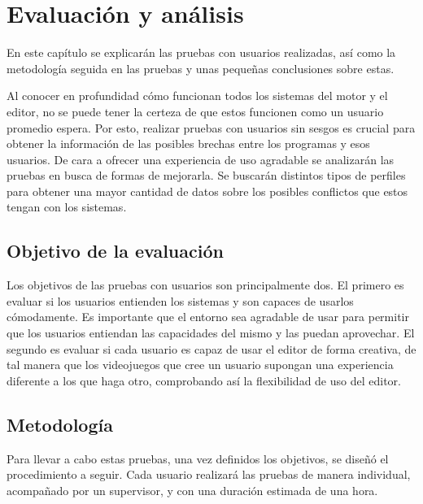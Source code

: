 \chapter{Evaluación y análisis}
\label{cap:conclusiones}



\begin{resumen}
En este capítulo se explicarán las pruebas con usuarios realizadas, así como la metodología seguida en las pruebas y unas pequeñas conclusiones sobre estas.
\end{resumen}

Al conocer en profundidad cómo funcionan todos los sistemas del motor y el editor, no se puede tener la certeza de que estos funcionen como un usuario promedio espera. Por esto, realizar pruebas con usuarios sin sesgos es crucial para obtener la información de las posibles brechas entre los programas y esos usuarios. De cara a ofrecer una experiencia de uso agradable se analizarán las pruebas en busca de formas de mejorarla. Se buscarán distintos tipos de perfiles para obtener una mayor cantidad de datos sobre los posibles conflictos que estos tengan con los sistemas.

\section{Objetivo de la evaluación}
Los objetivos de las pruebas con usuarios son principalmente dos. El primero es evaluar si los usuarios entienden los sistemas y son capaces de usarlos cómodamente. Es importante que el entorno sea agradable de usar para permitir que los usuarios entiendan las capacidades del mismo y las puedan aprovechar. El segundo es evaluar si cada usuario es capaz de usar el editor de forma creativa, de tal manera que los videojuegos que cree un usuario supongan una experiencia diferente a los que haga otro, comprobando así la flexibilidad de uso del editor.

\section{Metodología}
Para llevar a cabo estas pruebas, una vez definidos los objetivos, se diseñó el procedimiento a seguir. Cada usuario realizará las pruebas de manera individual, acompañado por un supervisor, y con una duración estimada de una hora.

